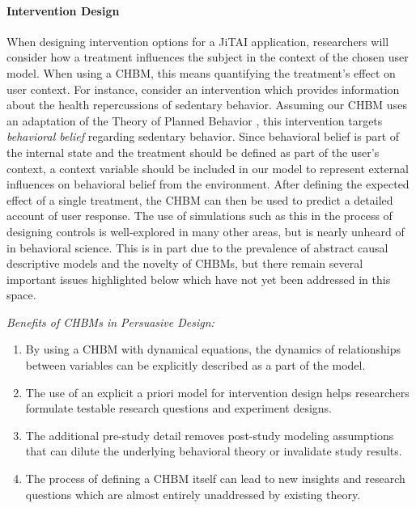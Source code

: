 \documentclass[runningheads,a4paper]{llncs}
\begin{document}
\paragraph{Intervention Design}
When designing intervention options for a JiTAI application, researchers will consider how a treatment influences the subject in the context of the chosen user model.
When using a CHBM, this means quantifying the treatment's effect on user context.
For instance, consider an intervention which provides information about the health repercussions of sedentary behavior.
Assuming our CHBM uses an adaptation of the Theory of Planned Behavior \cite{ajzen1991theory}, this intervention targets \emph{behavioral belief} regarding sedentary behavior.
Since behavioral belief is part of the internal state and the treatment should be defined as part of the user's context, a context variable should be included in our model to represent external influences on behavioral belief from the environment.
After defining the expected effect of a single treatment, the CHBM can then be used to predict a detailed account of user response.
The use of simulations such as this in the process of designing controls is well-explored in many other areas, but is nearly unheard of in behavioral science.
This is in part due to the prevalence of abstract causal descriptive models and the novelty of CHBMs, but there remain several important issues highlighted below which have not yet been addressed in this space.

\emph{Benefits of CHBMs in Persuasive Design:}
\begin{enumerate}
    \item By using a CHBM with dynamical equations, the dynamics of relationships between variables can be explicitly described as a part of the model.
    \item The use of an explicit a priori model for intervention design helps researchers formulate testable research questions and experiment designs.
    \item The additional pre-study detail removes post-study modeling assumptions that can dilute the underlying behavioral theory or invalidate study results.
    \item The process of defining a CHBM itself can lead to new insights and research questions which are almost entirely unaddressed by existing theory.
\end{enumerate}
\end{document}

